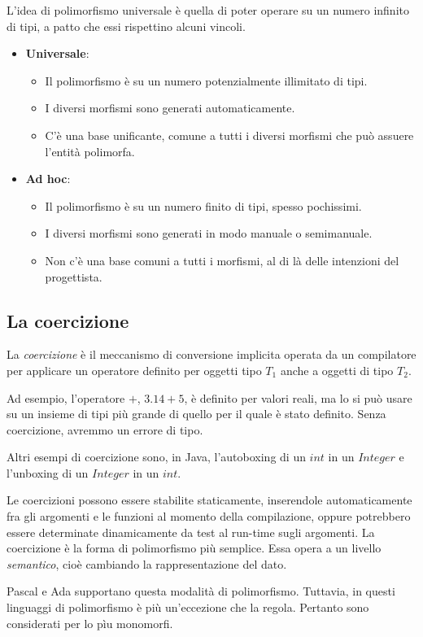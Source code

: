 \documentclass[12pt]{report}
\begin{document}
L'idea di polimorfismo universale è quella di poter operare su un numero infinito di tipi, a patto che essi rispettino alcuni vincoli.
\begin{itemize}
	\item \textbf{Universale}:
	\begin{itemize}
		\item Il polimorfismo è su un numero potenzialmente illimitato di tipi.
		\item I diversi morfismi sono generati automaticamente.
		\item C'è una base unificante, comune a tutti i diversi morfismi che può assuere l'entità polimorfa.
	\end{itemize}
	\item \textbf{Ad hoc}:
	\begin{itemize}
		\item Il polimorfismo è su un numero finito di tipi, spesso pochissimi.
		\item I diversi morfismi sono generati in modo manuale o semimanuale.
		\item Non c'è una base comuni a tutti i morfismi, al di là delle intenzioni del progettista.
	\end{itemize}
\end{itemize}
\subsection{La coercizione}
La \textit{coercizione} è il meccanismo di conversione implicita operata da un compilatore per applicare un operatore definito per oggetti tipo $T_1$ anche a oggetti di tipo $T_2$.

Ad esempio, l'operatore $+$, $3.14 + 5$,  è definito per valori reali, ma lo si può usare su un insieme di tipi più grande di quello per il quale è stato definito. Senza coercizione, avremmo un errore di tipo.

Altri esempi di coercizione sono, in Java, l'autoboxing di un $int$ in un $Integer$ e l'unboxing di un $Integer$ in un $int$.

Le coercizioni possono essere stabilite staticamente, inserendole automaticamente fra gli argomenti e le funzioni al momento della compilazione, oppure potrebbero essere determinate dinamicamente da test al run-time sugli argomenti. La coercizione è la forma di polimorfismo più semplice. Essa opera a un livello \textit{semantico}, cioè cambiando la rappresentazione del dato.

Pascal e Ada supportano questa modalità di polimorfismo. Tuttavia, in questi linguaggi di polimorfismo è più un'eccezione che la regola. Pertanto sono considerati per lo pìu monomorfi.
\end{document}
